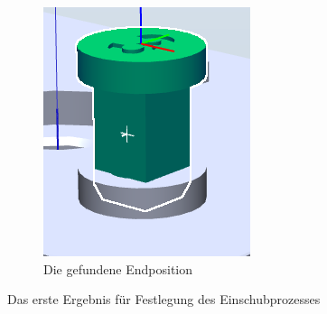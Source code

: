 \documentclass[14pt,a4paper,titlepage]{article}
\begin{document}
\begin{figure}[b!]
\begin{subfigure}{0.3\linewidth}
					\includegraphics[width=\linewidth]{result1.png}
					\caption{Die gefundene Endposition}
				\end{subfigure}
			\caption{Das erste Ergebnis für Festlegung des Einschubprozesses}
			\end{figure}
\end{document}
